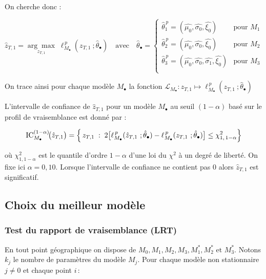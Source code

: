 \documentclass[
  article,
  nofooter,
  noheadings]{jss}
\begin{document}
On cherche donc :

\[
\hat{z}_{T,1} = \underset{z_{T,1}}{\arg\max} \; \ell_{M_\bullet}^{\,p}(z_{T,1} \ ; \hat{\theta}_{\bullet}) \quad \text{avec} \quad
\hat{\theta}_{\bullet} = \begin{cases}
\hat{\theta}_{1}^{\,p} = (\hat{\mu_0}, \hat{\sigma_0}, \hat{\xi_0}) & \text{pour } M_1 \\
\hat{\theta}_2^{\,p} = (\hat{\mu_0}, \hat{\sigma_0}, \hat{\xi_0}) & \text{pour } M_2 \\
\hat{\theta}_3^{\,p} = (\hat{\mu_0}, \hat{\sigma_0}, \hat{\sigma_1}, \hat{\xi_0}) & \text{pour } M_3 \\
\end{cases}
\]

On trace ainsi pour chaque modèle \(M_\bullet\) la fonction
\({\displaystyle \mathcal{L}_{M_\bullet} : z_{T,1} {\mapsto} \ell_{M_\bullet}^{\,p}(z_{T,1} \ ; \hat{\theta}_{\bullet})}\)

L'intervalle de confiance de \(\hat{z}_{T,1}\) pour un modèle
\(M_\bullet\) au seuil \((1 - \alpha)\) basé sur le profil de
vraisemblance est donné par :

\[
\operatorname{IC}_{M_\bullet}^{(1-\alpha)}\!\bigl(\hat{z}_{T,1}\bigr)
   = \Bigl\{\, z_{T,1}\;:\;
        2\bigl[\ell_{M_\bullet}^{\,p}(\hat{z}_{T,1} \ ; \hat{\theta}_{\bullet})-\ell_{M_\bullet}^{\,p}(z_{T,1} \ ; \hat{\theta}_{\bullet})\bigr]
        \le \chi^{2}_{1,\,1-\alpha} \Bigr\}
\]

où \(\chi^2_{1,1-\alpha}\) est le quantile d'ordre \(1 - \alpha\) d'une
loi du \(\chi^2\) à un degré de liberté. On fixe ici \(\alpha=0{,}10\).
Lorsque l'intervalle de confiance ne contient pas 0 alors
\(\hat{z}_{T,1}\) est significatif.

\subsection{Choix du meilleur modèle}\label{choix-du-meilleur-moduxe8le}

\subsubsection{Test du rapport de vraisemblance
(LRT)}\label{test-du-rapport-de-vraisemblance-lrt}

En tout point géographique on dispose de
\(M_0, M_1, M_2, M_3, M_1^\ast, M_2^\ast \text{ et } M_3^\ast\). Notons
\(k_j\) le nombre de paramètres du modèle \(M_j\). Pour chaque modèle
non stationnaire \(j\neq 0\) et chaque point \(i\)\,:
\end{document}
